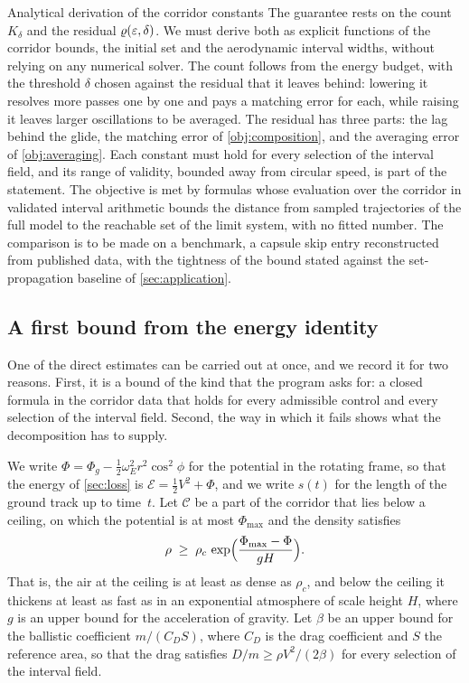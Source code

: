 \documentclass[english,11pt]{extarticle}
\begin{document}
\begin{openitem}{Analytical derivation of the corridor constants}
\label{obj:constants}
The guarantee rests on the count $K_\delta$ and the residual
$\varrho(\varepsilon,\delta)$. We must derive both as explicit functions of the
corridor bounds, the initial set and the aerodynamic interval widths,
without relying on any numerical solver. The count follows from the energy
budget, with the threshold $\delta$ chosen against the residual that it
leaves behind: lowering it resolves more passes one by one and pays a
matching error for each, while raising it leaves larger oscillations to be
averaged. The residual has three parts: the lag behind the glide, the
matching error of \cref{obj:composition}, and the averaging error of
\cref{obj:averaging}. Each constant must hold for every selection of the
interval field, and its range of validity, bounded away from circular speed,
is part of the statement. The objective is met by formulas whose evaluation
over the corridor in validated interval arithmetic bounds the distance from
sampled trajectories of the full model to the reachable set of the limit
system, with no fitted number. The comparison is to be made on a benchmark,
a capsule skip entry reconstructed from published data, with the tightness
of the bound stated against the set-propagation baseline of
\cref{sec:application}.
\end{openitem}

\subsection{A first bound from the energy identity}\label{sec:first-bound}
One of the direct estimates can be carried out at once, and we record it
for two reasons. First, it is a bound of the kind that the program asks for:
a closed formula in the corridor data that holds for every admissible
control and every selection of the interval field. Second, the way in which
it fails shows what the decomposition has to supply.

We write $\Phi = \Phi_g - \tfrac12\omega_E^2 r^2\cos^2\phi$ for the
potential in the rotating frame, so that the energy of \cref{sec:loss} is
$\mathcal{E} = \tfrac12 V^2 + \Phi$, and we write $s(t)$ for the length of
the ground track up to time~$t$. Let $\mathcal{C}$ be a part of the
corridor that lies below a ceiling, on which the potential is at most
$\Phi_{\max}$ and the density satisfies
\[
  \rho \;\ge\; \rho_c\,
  \exp\Bigl(\frac{\Phi_{\max}-\Phi}{g H}\Bigr) .
\]
That is, the air at the ceiling is at least as dense as $\rho_c$, and
below the ceiling it thickens at least as fast as in an exponential
atmosphere of scale height $H$, where $g$ is an upper bound for the
acceleration of gravity. Let $\beta$ be an upper bound for the ballistic
coefficient $m/(C_D S)$, where $C_D$ is the drag coefficient and $S$ the
reference area, so that the drag satisfies $D/m \ge \rho V^2/(2\beta)$ for
every selection of the interval field.
\end{document}
